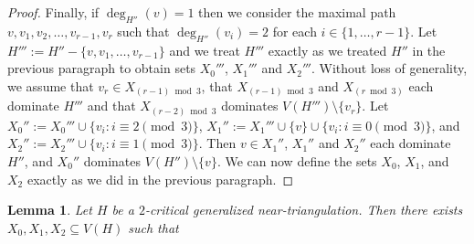 \documentclass[12pt]{article}
\newtheorem{lem}{Lemma}
\theoremstyle{definition}
\begin{document}
\begin{proof}
  Finally, if $\deg_{H''}(v)=1$ then we consider the maximal path $v,v_1,v_2,\ldots,v_{r-1},v_r$ such that $\deg_{H''}(v_i)=2$ for each $i\in\{1,\ldots,r-1\}$.  Let $H''':=H''-\{v,v_1,\ldots,v_{r-1}\}$ and we treat $H'''$ exactly as we treated $H''$ in the previous paragraph to obtain sets $X_0'''$, $X_1'''$ and $X_2'''$.  Without loss of generality, we assume that $v_r\in X_{(r-1)\bmod 3}$, that $X_{(r-1)\bmod 3}$ and $X_{(r\bmod 3)}$ each dominate $H'''$ and that $X_{(r-2)\bmod 3}$ dominates  $V(H''')\setminus\{v_r\}$. Let $X_0'':=X_0'''\cup\{v_i:i\equiv 2\pmod 3\}$, $X_1'':=X_1'''\cup\{v\}\cup\{v_i:i\equiv 0\pmod 3\}$, and  $X_2'':=X_2'''\cup\{v_i:i\equiv 1\pmod 3\}$.  Then $v\in X_1''$, $X_1''$ and $X_2''$ each dominate $H''$, and $X_0''$ dominates $V(H'')\setminus\{v\}$.  We can now define the sets $X_0$, $X_1$, and $X_2$ exactly as we did in the previous paragraph.
\end{proof}


\begin{lem}\label{three_sets_coverage}
  Let $H$ be a $2$-critical generalized near-triangulation.  Then there exists $X_0,X_1,X_2\subseteq V(H)$ such that
\end{lem}
\end{document}
